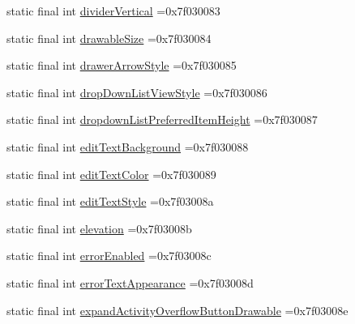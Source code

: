 \begin{DoxyCompactItemize}
\item 
static final int \mbox{\hyperlink{classbr_1_1unb_1_1cic_1_1mp_1_1marketmaster_1_1test_1_1R_1_1attr_a99e15f20a43b155a9e27ac16b312016f}{divider\+Vertical}} =0x7f030083
\item 
static final int \mbox{\hyperlink{classbr_1_1unb_1_1cic_1_1mp_1_1marketmaster_1_1test_1_1R_1_1attr_a205dca512339f73d9c041c7088fc0a09}{drawable\+Size}} =0x7f030084
\item 
static final int \mbox{\hyperlink{classbr_1_1unb_1_1cic_1_1mp_1_1marketmaster_1_1test_1_1R_1_1attr_a72e80634da0a61cb059693a2e5b60c9c}{drawer\+Arrow\+Style}} =0x7f030085
\item 
static final int \mbox{\hyperlink{classbr_1_1unb_1_1cic_1_1mp_1_1marketmaster_1_1test_1_1R_1_1attr_a358a9bd4fea09db69c473c50b6ba30cf}{drop\+Down\+List\+View\+Style}} =0x7f030086
\item 
static final int \mbox{\hyperlink{classbr_1_1unb_1_1cic_1_1mp_1_1marketmaster_1_1test_1_1R_1_1attr_a67dfe7f0a7b1e98fd129c41a24908037}{dropdown\+List\+Preferred\+Item\+Height}} =0x7f030087
\item 
static final int \mbox{\hyperlink{classbr_1_1unb_1_1cic_1_1mp_1_1marketmaster_1_1test_1_1R_1_1attr_a131f347662c0637b8a889b4761544f3a}{edit\+Text\+Background}} =0x7f030088
\item 
static final int \mbox{\hyperlink{classbr_1_1unb_1_1cic_1_1mp_1_1marketmaster_1_1test_1_1R_1_1attr_a51e896505dd649e14584d278b1a96e8c}{edit\+Text\+Color}} =0x7f030089
\item 
static final int \mbox{\hyperlink{classbr_1_1unb_1_1cic_1_1mp_1_1marketmaster_1_1test_1_1R_1_1attr_ada64ef79cbb846c391cbd3272742c0fd}{edit\+Text\+Style}} =0x7f03008a
\item 
static final int \mbox{\hyperlink{classbr_1_1unb_1_1cic_1_1mp_1_1marketmaster_1_1test_1_1R_1_1attr_a0e1a54400e73b768c027643c0e84154f}{elevation}} =0x7f03008b
\item 
static final int \mbox{\hyperlink{classbr_1_1unb_1_1cic_1_1mp_1_1marketmaster_1_1test_1_1R_1_1attr_a0475c50936668c9c85eb4efce8f1191f}{error\+Enabled}} =0x7f03008c
\item 
static final int \mbox{\hyperlink{classbr_1_1unb_1_1cic_1_1mp_1_1marketmaster_1_1test_1_1R_1_1attr_af5f0544ec6798e2f1dc8e0caae4b5db6}{error\+Text\+Appearance}} =0x7f03008d
\item 
static final int \mbox{\hyperlink{classbr_1_1unb_1_1cic_1_1mp_1_1marketmaster_1_1test_1_1R_1_1attr_ab4e241ee62c1f49881be49bc771a77f3}{expand\+Activity\+Overflow\+Button\+Drawable}} =0x7f03008e

\end{DoxyCompactItemize}
